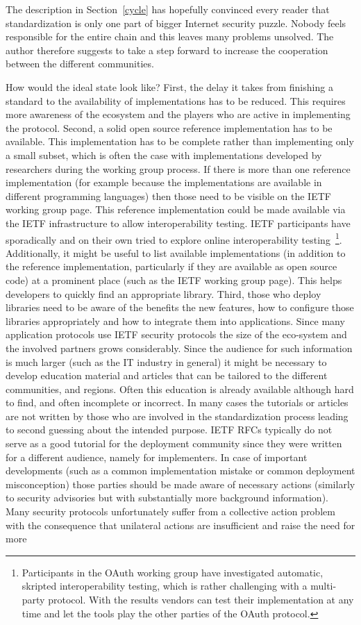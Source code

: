 \documentclass[peerreview, a4paper, 7pt]{IEEEtran}
\begin{document}
The description in Section~\ref{cycle} has hopefully convinced every reader that standardization is only one part of bigger Internet security puzzle. Nobody feels responsible for the entire chain and this leaves many problems unsolved. The author therefore suggests to take a step forward to increase the cooperation between the different communities. 

How would the ideal state look like? First, the delay it takes from finishing a standard to the availability of implementations has to be reduced. This requires more awareness of the ecosystem and the players who are active in implementing the protocol. Second, a solid open source reference implementation has to be available. This implementation has to be complete rather than implementing only a small subset, which is often the case with implementations developed by researchers during the working group process. If there is more than one reference implementation (for example because the implementations are available in different programming languages) then those need to be visible on the IETF working group page. This reference implementation could be made available via the IETF infrastructure to allow interoperability testing. IETF participants have sporadically and on their own tried to explore online interoperability testing~\footnote{Participants in the OAuth working group have investigated automatic, skripted interoperability testing, which is rather challenging with a multi-party protocol. With the results vendors can test their implementation at any time and let the tools play the other parties of the OAuth protocol.}. Additionally, it might be useful to list available implementations (in addition to the reference implementation, particularly if they are available as open source code) at a prominent place (such as the IETF working group page). This helps developers to quickly find an appropriate library. Third, those who deploy libraries need to be aware of the benefits the new features, how to configure those libraries appropriately and how to integrate them into applications. Since many application protocols use IETF security protocols the size of the eco-system and the involved partners grows considerably. Since the audience for such information is much larger (such as the IT industry in general) it might be necessary to develop education material and articles that can be tailored to the different communities, and regions. Often this education is already available although hard to find, and often incomplete or incorrect. In many cases the tutorials or articles are not written by those who are involved in the standardization process leading to second guessing about the intended purpose. IETF RFCs typically do not serve as a good tutorial for the deployment community since they were written for a different audience, namely for implementers. In case of important developments (such as a common implementation mistake or common deployment misconception) those parties should be made aware of necessary actions (similarly to security advisories but with substantially more background information). Many security protocols unfortunately suffer from a collective action problem with the consequence that unilateral actions are insufficient and raise the need for more 
\end{document}
